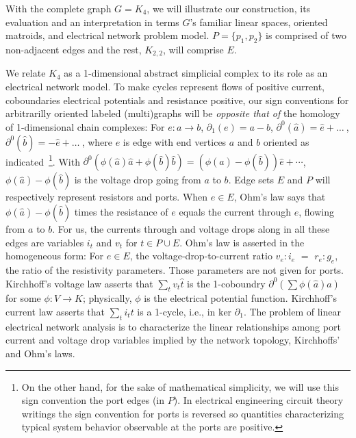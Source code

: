 With the complete graph $G=K_4$, we will illustrate our construction,
its evaluation and an interpretation
in terms $G$'s familiar linear spaces, oriented matroids, and electrical
network problem model.  $P=\{p_1, p_2\}$ is comprised of two non-adjacent
edges and the rest, $K_{2,2}$, will comprise $E$.  

We relate $K_4$ as a 1-dimensional abstract simplicial complex to
its role as an electrical network model.
To make cycles represent flows of positive current,
coboundaries electrical potentials and resistance positive,
our sign conventions for arbitrarilly oriented labeled (multi)graphs
will be \emph{opposite that of} the homology of 1-dimensional chain complexes:
For $e : a \rightarrow b$, $\partial_1(e)=a-b$, $\partial^0(\hat{a})=\hat{e}+ \ldots\  $,
$\partial^0(\hat{b})=-\hat{e}+ \ldots\  $, where $e$ is edge with end vertices $a$ and $b$ oriented
as indicated\
\footnote{
On the other hand, for the sake of mathematical simplicity,
we will use this sign convention the port edges (in $P$).
In electrical engineering
circuit theory writings the sign convention for ports is reversed
so quantities characterizing typical system behavior
observable at the ports
are positive.}.
With $\partial^0(\phi(\hat{a}) \hat{a} + \phi(\hat{b}) \hat{b}) = (\phi(\hat{a})-\phi(\hat{b}))\hat{e} + \cdots$,
$\phi(\hat{a})-\phi(\hat{b})$ is the voltage drop going from $a$ to $b$.
Edge sets $E$ and $P$ will respectively represent resistors and ports.
When $e\in E$,
Ohm's law says that
$\phi(\hat{a})-\phi(\hat{b})$ times the resistance of $e$ equals the current through $e$,
flowing from $a$ to $b$.
For us, the currents through and voltage drops along
in all these edges are variables $i_t$ and $v_t$ for $t\in P\cup E$.  Ohm's law
is asserted in the homogeneous form:  For $e\in E$, the voltage-drop-to-current ratio
$v_e:i_e$ $=$ $r_e:g_e$, the ratio of the resistivity parameters.
Those parameters are not given for ports.
Kirchhoff's voltage law asserts that $\sum_tv_t\hat{t}$ is the 1-coboundry $\partial^0(\sum \phi(\hat{a})\hat{a})$
for some $\phi:V\rightarrow K$; physically, $\phi$ is the electrical potential function.
Kirchhoff's current law asserts that $\sum_ti_t t$ is a 1-cycle, i.e., in $\text{ker }\partial_1$. 
The problem of linear electrical network analysis is to characterize
the linear relationships among port current and voltage drop variables implied by
the network topology, Kirchhoffs' and Ohm's laws.  


